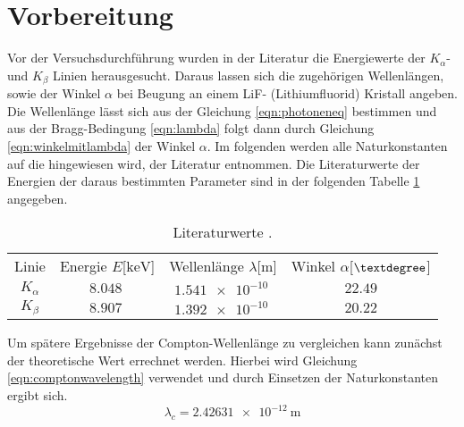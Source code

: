 \section{Vorbereitung}

Vor der Versuchsdurchführung wurden in der Literatur die Energiewerte der $K_{\alpha}$- und $K_{\beta}$ Linien herausgesucht. Daraus lassen sich die zugehörigen Wellenlängen, sowie der Winkel
$\alpha$ bei Beugung an einem LiF- (Lithiumfluorid) Kristall angeben. Die Wellenlänge lässt sich aus der Gleichung \eqref{eqn:photoneneq} bestimmen und aus der Bragg-Bedingung \eqref{eqn:lambda} folgt dann durch Gleichung \eqref{eqn:winkelmitlambda} der Winkel $\alpha$.
Im folgenden werden alle Naturkonstanten auf die hingewiesen wird, der Literatur \cite{Naturkonstanten} entnommen.
Die Literaturwerte der Energien der daraus bestimmten Parameter \cite{database} sind in der folgenden Tabelle \ref{tab:vorbereitung} angegeben.
\begin{table}
\centering
\caption{Literaturwerte \cite{database}.}
\label{tab:vorbereitung}
\begin{tabular}{c c c c}
    \toprule
    Linie & Energie $E$[$\si{\kilo\electronvolt}$] & Wellenlänge $\lambda$[$\si{\meter}$] & Winkel $\alpha$[$\textdegree$]\\
    $K_{\alpha}$    &  $\SI{8.048}{}$ & $\SI{1.541e-10}{}$  & $22.49$ \\
    $K_{\beta}$   &   $\SI{8.907}{}$  & $\SI{1.392e-10}{}$  & $20.22$ \\
    \midrule
\end{tabular}
\end{table}
Um spätere Ergebnisse der Compton-Wellenlänge zu vergleichen kann zunächst der theoretische Wert errechnet werden. Hierbei wird Gleichung
\eqref{eqn:comptonwavelength} verwendet und durch Einsetzen der Naturkonstanten ergibt sich.
\begin{equation}
\label{eqn:comptontheoriewert}
\lambda_{c} = \SI{2.42631e-12}{\meter}
\end{equation}